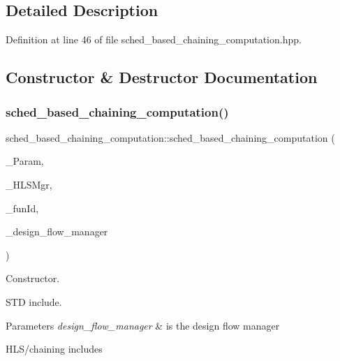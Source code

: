 \subsection{Detailed Description}


Definition at line 46 of file sched\+\_\+based\+\_\+chaining\+\_\+computation.\+hpp.



\subsection{Constructor \& Destructor Documentation}
\mbox{\label{classsched__based__chaining__computation_a3cd8266c4d472fd3de6f7e147656a911}} 
\subsubsection{\texorpdfstring{sched\+\_\+based\+\_\+chaining\+\_\+computation()}{sched\_based\_chaining\_computation()}}
{\footnotesize\ttfamily sched\+\_\+based\+\_\+chaining\+\_\+computation\+::sched\+\_\+based\+\_\+chaining\+\_\+computation (\begin{DoxyParamCaption}\item[{const \hyperlink{Parameter_8hpp_a37841774a6fcb479b597fdf8955eb4ea}{Parameter\+Const\+Ref}}]{\+\_\+\+Param,  }\item[{const \hyperlink{hls__manager_8hpp_acd3842b8589fe52c08fc0b2fcc813bfe}{H\+L\+S\+\_\+manager\+Ref}}]{\+\_\+\+H\+L\+S\+Mgr,  }\item[{unsigned int}]{\+\_\+fun\+Id,  }\item[{const Design\+Flow\+Manager\+Const\+Ref}]{\+\_\+design\+\_\+flow\+\_\+manager }\end{DoxyParamCaption})}



Constructor. 

S\+TD include.


\begin{DoxyParams}{Parameters}
{\em design\+\_\+flow\+\_\+manager} & is the design flow manager\\
\hline
\end{DoxyParams}
H\+L\+S/chaining includes 

